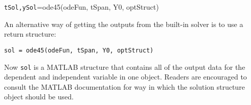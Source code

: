 \noindent\parbox{\textwidth}{
\centering
\lstinline[style=myMatlab]{tSol,ySol}=ode45(odeFun, tSpan, Y0, optStruct)

}

\vspace{0.25cm}

\newthought An alternative way of getting the outputs from the built-in solver is to use a return structure:

\vspace{0.25cm}

\noindent\parbox{\textwidth}{
\centering
\lstinline[style=myMatlab]{sol = ode45(odeFun, tSpan, Y0, optStruct)}
}

\vspace{0.25cm}

\noindent Now \lstinline[style=myMatlab]{sol} is a MATLAB structure that contains all of the output data for the dependent and independent variable in one object.  Readers are encouraged to consult the MATLAB documentation for way in which the solution structure object should be used.
